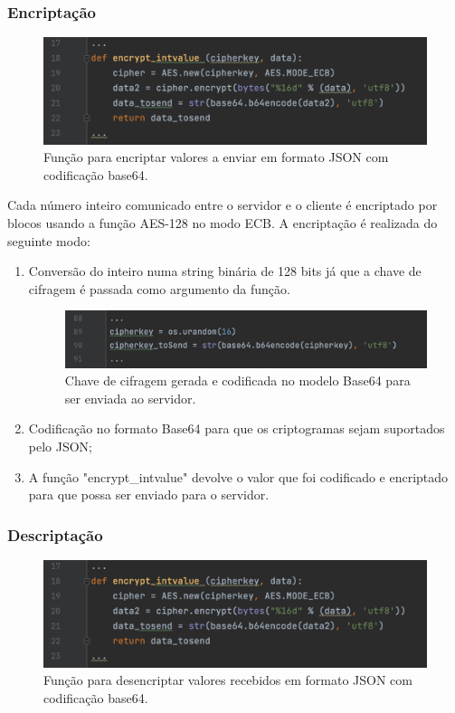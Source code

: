 \documentclass{report}
\begin{document}
\subsubsection{Encriptação}
\begin{figure}[H]
        \centering
        \includegraphics[scale=0.40]{encrypt}      
        \caption{Função para encriptar valores a enviar em formato JSON com codificação base64.}
\end{figure}
Cada número inteiro comunicado entre o servidor e o cliente é encriptado por blocos usando a função AES-128 no modo ECB. A encriptação é realizada do seguinte modo: 
\begin{enumerate}
\item Conversão do inteiro numa string binária de 128 bits já que a chave de cifragem é passada como argumento da função.
\begin{figure}[H]
        \centering
        \includegraphics[scale=0.40]{chaveCifra}      
        \caption{Chave de cifragem gerada e codificada no modelo Base64 para ser enviada ao servidor.}
\end{figure}
\item Codificação no formato Base64 para que os criptogramas sejam suportados pelo JSON;
\item A função "encrypt\_intvalue" devolve o valor que foi codificado e encriptado para que possa ser enviado para o servidor.
\end{enumerate}
\subsubsection{Descriptação}
\begin{figure}[H]
        \centering
        \includegraphics[scale=0.40]{encrypt}      
        \caption{Função para desencriptar valores recebidos em formato JSON com codificação base64.}
\end{figure}
\end{document}
